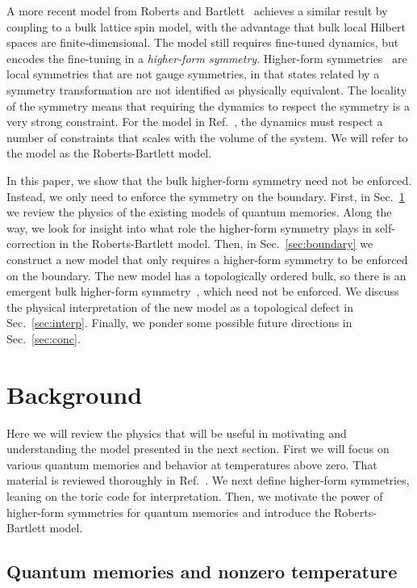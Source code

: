 A more recent model from Roberts and Bartlett~\cite{RobertsBartlett2020} achieves a similar result by coupling to a bulk lattice spin model, with the advantage that bulk local Hilbert spaces are finite-dimensional. The model still requires fine-tuned dynamics, but encodes the fine-tuning in a \emph{higher-form symmetry}. Higher-form symmetries~\cite{Nussinov2009Topological, Gaiotto2015Generalized, Lake2018Higher} are local symmetries that are not gauge symmetries, in that states related by a symmetry transformation are not identified as physically equivalent. The locality of the symmetry means that requiring the dynamics to respect the symmetry is a very strong constraint. For the model in Ref.~\cite{RobertsBartlett2020}, the dynamics must respect a number of constraints that scales with the volume of the system. We will refer to the model as the Roberts-Bartlett model.

In this paper, we show that the bulk higher-form symmetry need not be enforced. Instead, we only need to enforce the symmetry on the boundary.
First, in Sec.~\ref{sec:back} we review the physics of the existing models of quantum memories. Along the way, we look for insight into what role the higher-form symmetry plays in self-correction in the Roberts-Bartlett model. Then, in Sec.~\ref{sec:boundary} we construct a new model that only requires a higher-form symmetry to be enforced on the boundary. The new model has a topologically ordered bulk, so there is an emergent bulk higher-form symmetry~\cite{Wen2019Higher}, which need not be enforced. We discuss the physical interpretation of the new model as a topological defect in Sec.~\ref{sec:interp}.
Finally, we ponder some possible future directions in Sec.~\ref{sec:conc}.

\section{Background} \label{sec:back}

Here we will review the physics that will be useful in motivating and understanding the model presented in the next section. First we will focus on various quantum memories and behavior at temperatures above zero. That material is reviewed thoroughly in Ref.~\cite{Brown2016Finite}. We next define higher-form symmetries, leaning on the toric code for interpretation. Then, we motivate the power of higher-form symmetries for quantum memories and introduce the Roberts-Bartlett model.

\subsection{Quantum memories and nonzero temperature} \label{sub:mems}

